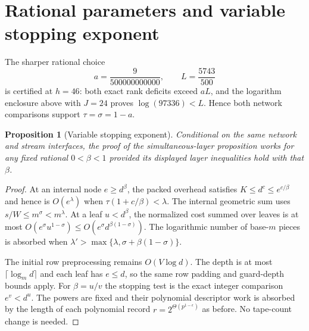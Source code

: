 \documentclass[11pt]{article}
\newtheorem{proposition}{Proposition}
\begin{document}
\section{Rational parameters and variable stopping exponent}
The sharper rational choice
\[
 a=\frac9{500000000000},\qquad L=\frac{5743}{500}
\]
is certified at $h=46$: both exact rank deficits exceed $aL$, and the
logarithm enclosure above with $J=24$ proves $\log(97336)<L$.
Hence both network comparisons support $\tau=\sigma=1-a$.

\begin{proposition}[Variable stopping exponent]
Conditional on the same network and stream interfaces, the proof of the
simultaneous-layer proposition works for any fixed rational $0<\beta<1$
provided its displayed layer inequalities hold with that $\beta$.
\end{proposition}
\begin{proof}
At an internal node $e\ge d^\beta$, the packed overhead satisfies
$K\le d^c\le e^{c/\beta}$ and hence is $O(e^\lambda)$ when
$\tau(1+c/\beta)<\lambda$. The internal geometric sum uses
$s/W\le m^\sigma<m^\lambda$. At a leaf $u<d^\beta$, the normalized
cost summed over leaves is at most
$O(e^\sigma u^{1-\sigma})\le O(e^\sigma d^{\beta(1-\sigma)})$.
The logarithmic number of base-$m$ pieces is absorbed when
$\lambda'>\max\{\lambda,\sigma+\beta(1-\sigma)\}$.

The initial row preprocessing remains $O(V\log d)$. The depth is at most
$\lceil\log_m d\rceil$ and each leaf has $e\le d$, so the same row
padding and guard-depth bounds apply. For $\beta=u/v$ the stopping test
is the exact integer comparison $e^v<d^u$. The powers are fixed and their
polynomial descriptor work is absorbed by the length of each polynomial record
$r=2^{\Theta(p^{1-\epsilon})}$ as before. No tape-count change is needed.
\end{proof}
\end{document}
